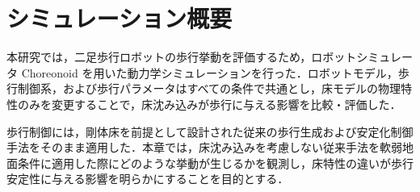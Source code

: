 \section{シミュレーション概要}
\label{sec:sim_overview}

本研究では，二足歩行ロボットの歩行挙動を評価するため，ロボットシミュレータ Choreonoid を用いた動力学シミュレーションを行った．ロボットモデル，歩行制御系，および歩行パラメータはすべての条件で共通とし，床モデルの物理特性のみを変更することで，床沈み込みが歩行に与える影響を比較・評価した．

歩行制御には，剛体床を前提として設計された従来の歩行生成および安定化制御手法をそのまま適用した．本章では，床沈み込みを考慮しない従来手法を軟弱地面条件に適用した際にどのような挙動が生じるかを観測し，床特性の違いが歩行安定性に与える影響を明らかにすることを目的とする．